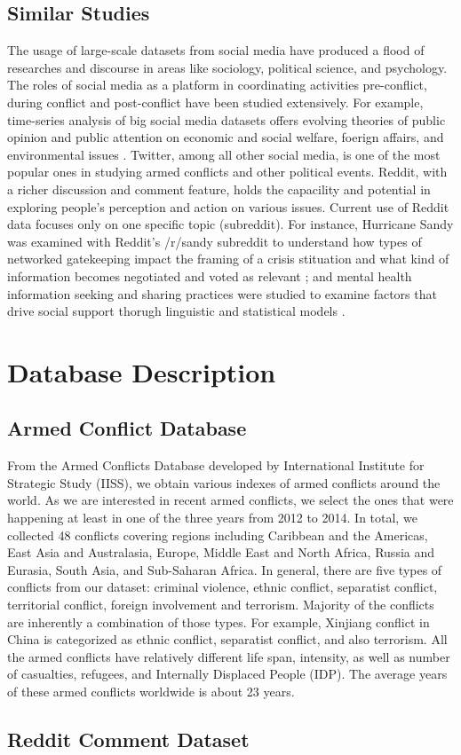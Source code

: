 \subsection{Similar Studies}
The usage of large-scale datasets from social media have produced a flood of researches and discourse in areas like sociology, political science, and psychology. The roles of social media as a platform in coordinating activities pre-conflict, during conflict and post-conflict have been studied extensively. For example, time-series analysis of big social media datasets offers evolving theories of public opinion and public attention on economic and social welfare, foerign affairs, and environmental issues \cite{RussellNeuman2014}. Twitter, among all other social media, is one of the most popular ones in studying armed conflicts and other political events. Reddit, with a richer discussion and comment feature, holds the capacility and potential in exploring people's perception and action on various issues. Current use of Reddit data focuses only on one specific topic (subreddit). For instance, Hurricane Sandy was examined with Reddit's /r/sandy subreddit to understand how types of networked gatekeeping impact the framing of a crisis stituation and what kind of information becomes negotiated and voted as relevant \cite{Leavitt}; and mental health information seeking and sharing practices were studied to examine factors that drive social support thorugh linguistic and statistical models \cite{dechoudhury2014mental}.


\section{Database Description}
\subsection{Armed Conflict Database}
From the Armed Conflicts Database developed by International Institute for Strategic Study (IISS), we obtain various indexes of armed conflicts around the world. As we are interested in recent armed conflicts, we select the ones that were happening at least in one of the three years from 2012 to 2014. In total, we collected 48 conflicts covering regions including Caribbean and the Americas, East Asia and Australasia, Europe, Middle East and North Africa, Russia and Eurasia, South Asia, and Sub-Saharan Africa. In general, there are five types of conflicts from our dataset: criminal violence, ethnic conflict, separatist conflict, territorial conflict, foreign involvement and terrorism. Majority of the conflicts are inherently a combination of those types. For example, Xinjiang conflict in China is categorized as ethnic conflict, separatist conflict, and also terrorism. All the armed conflicts have relatively different life span, intensity, as well as number of casualties, refugees, and Internally Displaced People (IDP). The average years of these armed conflicts worldwide is about 23 years.

\subsection{Reddit Comment Dataset}
